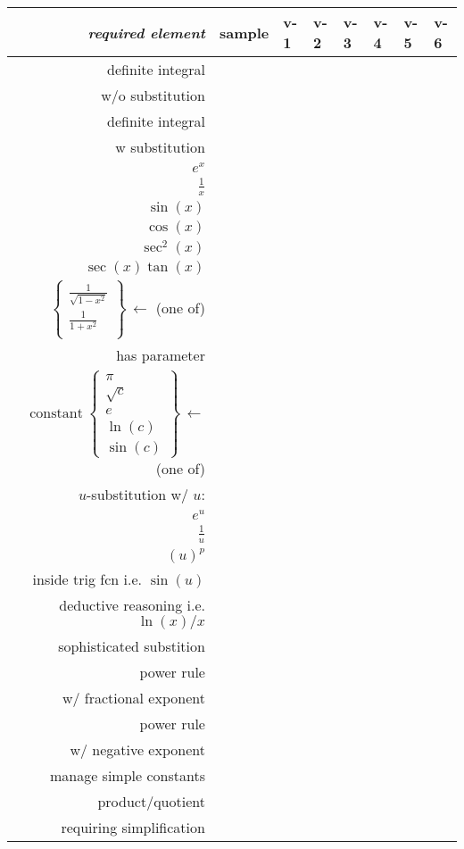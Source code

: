 \documentclass[12pt]{article}
\begin{document}
\phantom{foo}
\vspace{0.5in}

\begin{tabular}{r|l|l|l|l|l|l|l|}
\textsl{required element}   & sample & v-1 \phantom{xx} & v-2 \phantom{xx} & v-3 \phantom{xx} & v-4 \phantom{xx} & v-5 \phantom{xx} & v-6 \phantom{xx} \\ \hline \hline
definite integral & & & & & & & \\ 
w/o substitution& & & & & & & \\ \hline
definite integral & & & & & & & \\ 
w substitution& & & & & & & \\ \hline
\hline
$e^x$                       & & & & & & & \\ \hline
$\frac{1}{x}$                     & & & & & & & \\ \hline
$\sin(x)$                   & & & & & & & \\ \hline
$\cos(x)$                   & & & & & & & \\ \hline
$\sec^2(x)$                   & & & & & & & \\ \hline
$\sec(x)\tan(x)$                   & & & & & & & \\ \hline

$\operatorname{\quad}\left\{\begin{matrix} \frac{1}{\sqrt{1-x^2}} \\ \frac{1}{1+x^2} \\  \end{matrix}\right\} \,\leftarrow$ (one of)
                            & & & & & & & \\ \hline
has parameter               & & & & & & & \\ \hline
$\operatorname{constant}\left\{\begin{matrix} \pi \\ \sqrt{c} \\  e \\ \ln(c) \\ \sin(c) \end{matrix}\right\} \,\leftarrow$ (one of)
                            & & & & & & & \\ \hline
$u$-substitution w/ $u$:   & & & & & & & \\ 
  $e^u$ & & & & & & & \\
  $\frac{1}{u}$ & & & & & & & \\
  $(u)^p$  & & & & & & & \\
  inside trig fcn i.e. $\sin(u)$ & & & & & & & \\ 
  deductive reasoning i.e.$\ln(x)/x$& & & & & & & \\ \hline
sophisticated substition           & & & & & & & \\ \hline
power rule  & & & & & & & \\
w/ fractional exponent      & & & & & & & \\ \hline
power rule  & & & & & & & \\
w/ negative exponent        & & & & & & & \\ \hline

manage simple constants       & & & & & & & \\ \hline
product/quotient       & & & & & & & \\ 
requiring simplification  & & & & & & & \\ \hline


\end{tabular}
\end{document}
